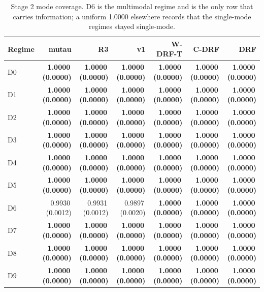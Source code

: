 \begin{table}[htbp]
\centering
\caption{Stage 2 mode coverage. D6 is the multimodal regime and is the only row that carries information; a uniform 1.0000 elsewhere records that the single-mode regimes stayed single-mode.}
\label{tab:p55s2-mode}
\scriptsize
\setlength{\tabcolsep}{3.2pt}
\begin{tabular}{@{}lrrrrrr@{}}
\toprule
Regime & mutau & R3 & v1 & W-DRF-T & C-DRF & DRF \\
\midrule
D0 & \textbf{1.0000\,(0.0000)} & \textbf{1.0000\,(0.0000)} & \textbf{1.0000\,(0.0000)} & \textbf{1.0000\,(0.0000)} & \textbf{1.0000\,(0.0000)} & \textbf{1.0000\,(0.0000)} \\
D1 & \textbf{1.0000\,(0.0000)} & \textbf{1.0000\,(0.0000)} & \textbf{1.0000\,(0.0000)} & \textbf{1.0000\,(0.0000)} & \textbf{1.0000\,(0.0000)} & \textbf{1.0000\,(0.0000)} \\
D2 & \textbf{1.0000\,(0.0000)} & \textbf{1.0000\,(0.0000)} & \textbf{1.0000\,(0.0000)} & \textbf{1.0000\,(0.0000)} & \textbf{1.0000\,(0.0000)} & \textbf{1.0000\,(0.0000)} \\
D3 & \textbf{1.0000\,(0.0000)} & \textbf{1.0000\,(0.0000)} & \textbf{1.0000\,(0.0000)} & \textbf{1.0000\,(0.0000)} & \textbf{1.0000\,(0.0000)} & \textbf{1.0000\,(0.0000)} \\
D4 & \textbf{1.0000\,(0.0000)} & \textbf{1.0000\,(0.0000)} & \textbf{1.0000\,(0.0000)} & \textbf{1.0000\,(0.0000)} & \textbf{1.0000\,(0.0000)} & \textbf{1.0000\,(0.0000)} \\
D5 & \textbf{1.0000\,(0.0000)} & \textbf{1.0000\,(0.0000)} & \textbf{1.0000\,(0.0000)} & \textbf{1.0000\,(0.0000)} & \textbf{1.0000\,(0.0000)} & \textbf{1.0000\,(0.0000)} \\
D6 & 0.9930\,(0.0012) & 0.9931\,(0.0012) & 0.9897\,(0.0020) & \textbf{1.0000\,(0.0000)} & \textbf{1.0000\,(0.0000)} & \textbf{1.0000\,(0.0000)} \\
D7 & \textbf{1.0000\,(0.0000)} & \textbf{1.0000\,(0.0000)} & \textbf{1.0000\,(0.0000)} & \textbf{1.0000\,(0.0000)} & \textbf{1.0000\,(0.0000)} & \textbf{1.0000\,(0.0000)} \\
D8 & \textbf{1.0000\,(0.0000)} & \textbf{1.0000\,(0.0000)} & \textbf{1.0000\,(0.0000)} & \textbf{1.0000\,(0.0000)} & \textbf{1.0000\,(0.0000)} & \textbf{1.0000\,(0.0000)} \\
D9 & \textbf{1.0000\,(0.0000)} & \textbf{1.0000\,(0.0000)} & \textbf{1.0000\,(0.0000)} & \textbf{1.0000\,(0.0000)} & \textbf{1.0000\,(0.0000)} & \textbf{1.0000\,(0.0000)} \\
\bottomrule
\end{tabular}
\end{table}

